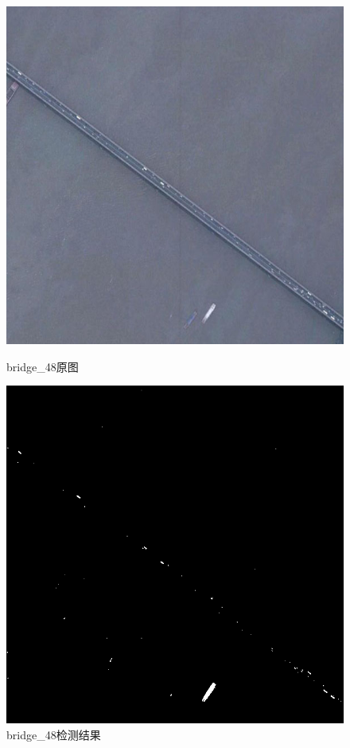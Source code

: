 \begin{figure}[H]
	\centering
	\begin{minipage}{0.45\linewidth}
		\includegraphics[width=\linewidth]{figure/bridge_48.jpg}
		\caption{bridge\_48原图}
	\end{minipage}
	\begin{minipage}{0.45\linewidth}
		\includegraphics[width=\linewidth]{figure/bridge_48_detection.png}
		\caption{bridge\_48检测结果}
	\end{minipage}
\end{figure}
